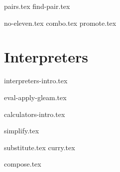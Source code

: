 \documentclass{exam}
\begin{document}
\newpage
\begin{questions}
    {pairs.tex}
    \newpage
    {find-pair.tex}
    \par\vspace*{2\baselineskip}
    {no-eleven.tex}
    \newpage
    {combo.tex}
    \newpage
    {promote.tex}
\end{questions}

\newpage
\section{Interpreters}
{interpreters-intro.tex}
\newpage
\begin{questions}
    {eval-apply-gleam.tex}
\end{questions}

\newpage
{calculators-intro.tex}
\newpage
\begin{questions}
    \setcounter{question}{1}
    {simplify.tex}
    \par\vspace*{2\baselineskip}
    {substitute.tex}
    \newpage
    {curry.tex}
    \par\vspace*{\baselineskip}
    {compose.tex}
\end{questions}
\end{document}
